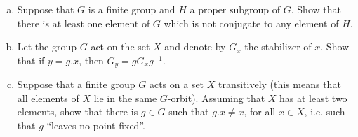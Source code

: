 \documentclass{article}
\newcounter{Problem}
\newenvironment{Problem}{\begin{Exercise}[name={Problem},
                                          counter={Problem}]}
                        {\end{Exercise}}
\begin{document}
\pagebreak
\begin{Problem}
\begin{enumerate}[(a)]
  \item{Suppose that $G$ is a finite group and $H$ a proper subgroup
      of $G$. Show that there is at least one element of $G$ which is
      not conjugate to any element of $H$.}
  \item{Let the group $G$ act on the set $X$ and denote by $G_x$ the
      stabilizer of $x$. Show that if $y = g . x$, then $G_y = g
      G_x g^{-1}$.}
  \item{Suppose that a finite group $G$ acts on a set $X$ transitively
      (this means that all elements of $X$ lie in the same
      $G$-orbit). Assuming that $X$ has at least two elements, show
      that there is $g \in G$ such that $g . x \neq x$, for all $x
      \in X$,
      i.e. such that $g$ ``leaves no point fixed''.}
\end{enumerate}
\end{Problem}
\end{document}
